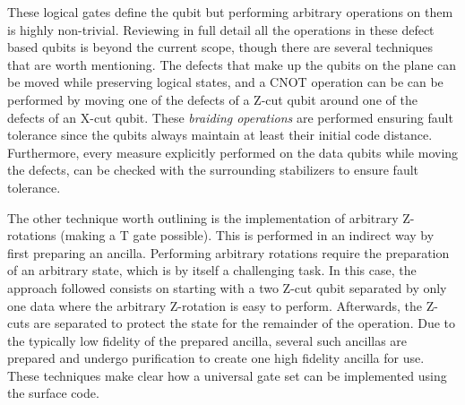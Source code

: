 These logical gates define the qubit but performing arbitrary operations on them
is highly non-trivial. Reviewing in full detail all the operations in these
defect based qubits is beyond the current scope, though there are several
techniques that are worth mentioning. The defects that make up the qubits on the
plane can be moved while preserving logical states, and a CNOT operation can be
can be performed by moving one of the defects of a Z-cut qubit around one of the
defects of an X-cut qubit. These \textit{braiding operations} are performed
ensuring fault tolerance since the qubits always maintain at least their initial
code distance. Furthermore, every measure explicitly performed on the data
qubits while moving the defects, can be checked with the surrounding stabilizers
to ensure fault tolerance.

The other technique worth outlining is the implementation of arbitrary
Z-rotations (making a T gate possible). This is performed in an indirect way by
first preparing an ancilla. Performing arbitrary rotations require the
preparation of an arbitrary state, which is by itself a challenging task. In
this case, the approach followed consists on starting with a two Z-cut qubit
separated by only one data where the arbitrary Z-rotation is easy to perform.
Afterwards, the Z-cuts are separated to protect the state for the
remainder of the operation. Due to the typically low fidelity of the prepared
ancilla, several such ancillas are prepared and undergo purification to create
one high fidelity ancilla for use. These techniques make clear how a universal
gate set can be implemented using the surface code.


